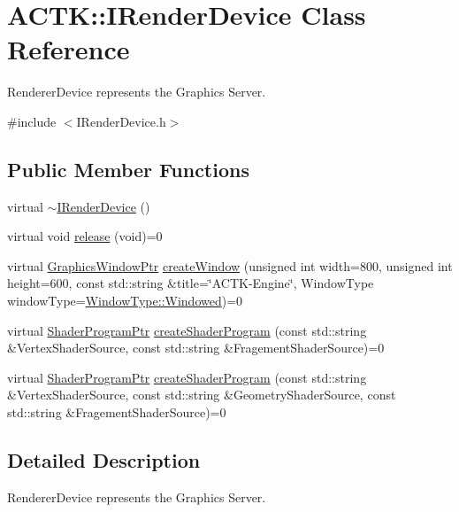 \hypertarget{class_a_c_t_k_1_1_i_render_device}{\section{A\-C\-T\-K\-:\-:I\-Render\-Device Class Reference}
\label{class_a_c_t_k_1_1_i_render_device}
}


Renderer\-Device represents the Graphics Server.  




{\ttfamily \#include $<$I\-Render\-Device.\-h$>$}

\subsection*{Public Member Functions}
\begin{DoxyCompactItemize}
\item 
virtual \hyperlink{class_a_c_t_k_1_1_i_render_device_a971cec72693671984693e2f255e98fc4}{$\sim$\-I\-Render\-Device} ()
\item 
virtual void \hyperlink{class_a_c_t_k_1_1_i_render_device_aa3b875c7f072e701e703d97b3fb4db44}{release} (void)=0
\item 
virtual \hyperlink{namespace_a_c_t_k_a73ab07fc6a568d003d19f3ed14ea7143}{Graphics\-Window\-Ptr} \hyperlink{class_a_c_t_k_1_1_i_render_device_a231ddea8df6e409d8fddd225ec92494f}{create\-Window} (unsigned int width=800, unsigned int height=600, const std\-::string \&title=\char`\"{}A\-C\-T\-K-\/Engine\char`\"{}, Window\-Type window\-Type=\hyperlink{namespace_a_c_t_k_a5cb71db6f350f73a1acaf41781bffb5bab13311ab51c4c34757f67f26580018dd}{Window\-Type\-::\-Windowed})=0
\item 
virtual \hyperlink{namespace_a_c_t_k_a34512c71be222dc06a2906d6c00d2c4f}{Shader\-Program\-Ptr} \hyperlink{class_a_c_t_k_1_1_i_render_device_a77ac05354c165206bfbfe1b43976174a}{create\-Shader\-Program} (const std\-::string \&Vertex\-Shader\-Source, const std\-::string \&Fragement\-Shader\-Source)=0
\item 
virtual \hyperlink{namespace_a_c_t_k_a34512c71be222dc06a2906d6c00d2c4f}{Shader\-Program\-Ptr} \hyperlink{class_a_c_t_k_1_1_i_render_device_a7fd79a2018650f1581b926871028c4e4}{create\-Shader\-Program} (const std\-::string \&Vertex\-Shader\-Source, const std\-::string \&Geometry\-Shader\-Source, const std\-::string \&Fragement\-Shader\-Source)=0
\end{DoxyCompactItemize}


\subsection{Detailed Description}
Renderer\-Device represents the Graphics Server. 

